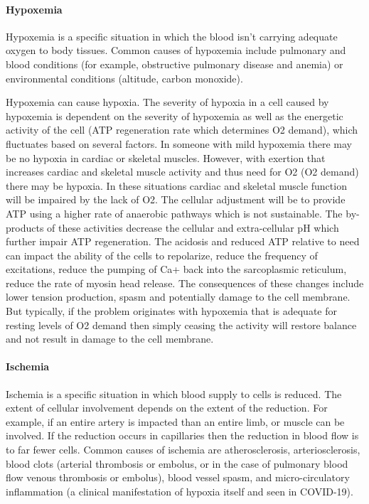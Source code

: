 \paragraph{Hypoxemia}
Hypoxemia is a specific situation in which the blood isn't carrying adequate oxygen to body tissues. Common causes of hypoxemia include pulmonary and blood conditions (for example, obstructive pulmonary disease and anemia) or environmental conditions (altitude, carbon monoxide). 

Hypoxemia can cause hypoxia. The severity of hypoxia in a cell caused by hypoxemia is dependent on the severity of hypoxemia as well as the energetic activity of the cell (ATP regeneration rate which determines O2 demand), which fluctuates based on several factors. In someone with mild hypoxemia there may be no hypoxia in cardiac or skeletal muscles. However, with exertion that increases cardiac and skeletal muscle activity and thus need for O2 (O2 demand) there may be hypoxia. In these situations cardiac and skeletal muscle function will be impaired by the lack of O2. The cellular adjustment will be to provide ATP using a higher rate of anaerobic pathways which is not sustainable. The by-products of these activities decrease the cellular and extra-cellular pH which further impair ATP regeneration. The acidosis and reduced ATP relative to need can impact the ability of the cells to repolarize, reduce the frequency of excitations, reduce the pumping of Ca+ back into the sarcoplasmic reticulum, reduce the rate of myosin head release. The consequences of these changes include lower tension production, spasm and potentially damage to the cell membrane. But typically, if the problem originates with hypoxemia that is adequate for resting levels of O2 demand then simply ceasing the activity will restore balance and not result in damage to the cell membrane.
 
\paragraph{Ischemia}
Ischemia is a specific situation in which  blood supply to cells is reduced. The extent of cellular involvement depends on the extent of the reduction. For example, if an entire artery is impacted than an entire limb, or muscle can be involved. If the reduction occurs in capillaries then the reduction in blood flow is to far fewer cells. Common causes of ischemia are atherosclerosis, arteriosclerosis,\footnotemark{} blood clots (arterial thrombosis or embolus, or in the case of pulmonary blood flow venous thrombosis or embolus), blood vessel spasm, and micro-circulatory inflammation (a clinical manifestation of hypoxia itself and seen in COVID-19). 

